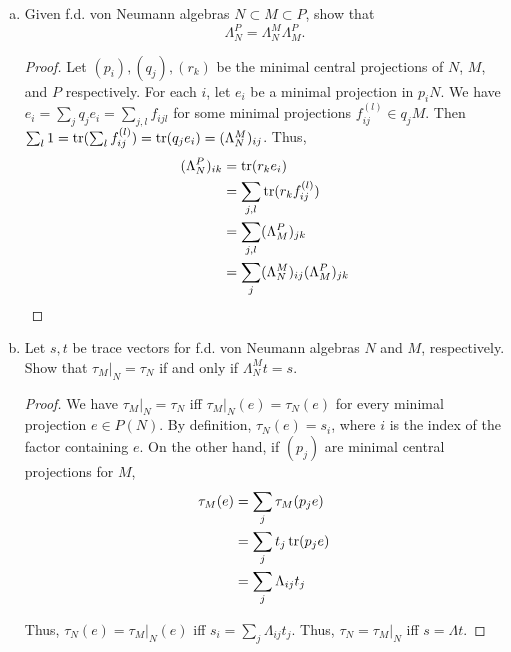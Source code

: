 \documentclass{article}
\begin{document}
  \begin{enumerate}[(a)]
    \item  Given f.d. von Neumann algebras $N \subset M \subset P$, show that
      $$\Lambda_N^P = \Lambda_N^M \Lambda_M^P.$$
      \begin{proof}
        Let $(p_i), (q_j), (r_k)$ be the minimal central projections of $N$, $M$, and $P$ respectively.  For each $i$, let $e_i$ be a minimal projection in $p_iN$.   We have $e_i = \sum_j q_j e_i = \sum_{j,l} f_{ijl}$ for some minimal projections $f_{ij}^{(l)} \in q_j M$.  Then $\sum_l 1 = \operatorname{tr}(\sum_l f_{ij}^{(l)}) = \operatorname{tr}(q_j e_i) = (\Lambda_N^M)_{ij}$. Thus, 
        \begin{align*}
          (\Lambda_N^P)_{ik} & = \operatorname{tr}(r_k e_i) \\
          & = \sum_{j,l} \operatorname{tr}(r_k f_{ij}^{(l)} ) \\
          & = \sum_{j,l} (\Lambda_M^P)_{jk} \\
          & = \sum_j  (\Lambda_N^M)_{ij} (\Lambda_M^P)_{jk}
        \end{align*}
      \end{proof}

      \item Let $s,t$ be trace vectors for f.d. von Neumann algebras $N$ and $M$, respectively.  Show that $\tau_M|_N = \tau_N$ if and only if $\Lambda_N^M t = s$.
        \begin{proof}
          We have $\tau_M|_N = \tau_N$ iff $\tau_M|_N(e) = \tau_N(e)$ for every minimal projection $e \in P(N)$.  By definition, $\tau_N(e) = s_i$, where $i$ is the index of the factor containing $e$.  On the other hand, if $(p_j)$ are minimal central projections for $M$,
\begin{align*}
  \tau_M(e) & = \sum_j \tau_M(p_j e) \\
  & = \sum_j t_j \operatorname{tr}(p_j e) \\
  & = \sum_j \Lambda_{ij} t_j  
\end{align*}

Thus, $\tau_N(e) = \tau_M|_N(e)$ iff $s_i = \sum_j \Lambda_{ij} t_j$.  Thus,
$\tau_N = \tau_M|_N$ iff $s = \Lambda t$.


      \end{proof}
  \end{enumerate}
\end{document}
